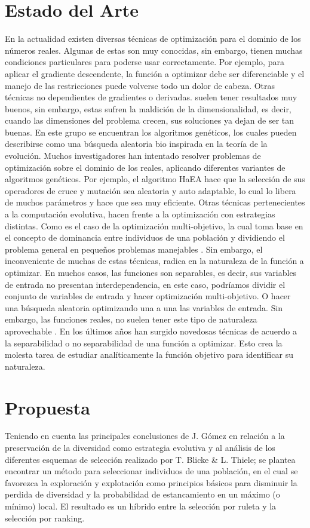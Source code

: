 \documentclass{llncs}
\begin{document}
\section{Estado del Arte}
En la actualidad existen diversas técnicas de optimización para el dominio de los números reales. Algunas de estas son muy conocidas, sin embargo, tienen muchas condiciones particulares para poderse usar correctamente. Por ejemplo, para aplicar el gradiente descendente, la función a optimizar debe ser diferenciable y el manejo de las restricciones puede volverse todo un dolor de cabeza. Otras técnicas no dependientes de gradientes o derivadas. suelen tener  resultados muy buenos, sin embargo, estas sufren la maldición de la dimensionalidad, es decir, cuando las dimensiones del problema crecen, sus soluciones ya dejan de ser tan buenas. En este grupo se encuentran los algoritmos genéticos, los cuales pueden describirse como una búsqueda aleatoria bio inspirada en la teoría de la evolución.
Muchos investigadores han intentado resolver problemas de optimización sobre el dominio de los reales, aplicando diferentes variantes de algoritmos genéticos. Por ejemplo, el algoritmo HaEA \cite{gomez} hace que la selección de sus operadores de cruce y mutación sea aleatoria y auto adaptable, lo cual lo libera de muchos parámetros y hace que sea muy eficiente. Otras técnicas pertenecientes a la computación evolutiva, hacen frente a la optimización con estrategias distintas. Como es el caso de la optimización multi-objetivo, la cual toma base en el concepto de dominancia entre individuos de una población y dividiendo el problema general en pequeños problemas manejables \cite{zitzler:laumans:thiele}. Sin embargo, el inconveniente de muchas de estas técnicas, radica en la naturaleza de la función a optimizar. En muchos casos, las funciones son separables, es decir, sus variables de entrada no presentan interdependencia, en este caso, podríamos dividir el conjunto de variables de entrada y hacer optimización multi-objetivo. O hacer una búsqueda aleatoria optimizando una a una las variables de entrada. Sin embargo, las funciones reales, no suelen tener este tipo de naturaleza aprovechable \cite{caaman}. 
En los últimos años han surgido novedosas técnicas de acuerdo a la separabilidad o no separabilidad de una función a optimizar. Esto crea la molesta tarea de estudiar analíticamente la función objetivo para identificar su naturaleza.

\section{Propuesta}
Teniendo en cuenta las principales conclusiones de J. Gómez \cite{gomez} en relación a la preservación de la diversidad como estrategia evolutiva y al análisis de los diferentes esquemas de selección realizado por T. Blicke \& L. Thiele\cite{blick:thiele}; se plantea encontrar un método para seleccionar individuos de una población, en el cual se favorezca la   exploración y explotación como principios básicos para disminuir la perdida de diversidad y la probabilidad de estancamiento en un máximo (o mínimo) local. El resultado es un híbrido entre la selección por ruleta y la selección por ranking.
\end{document}
